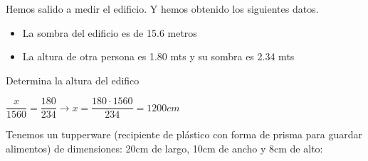 \documentclass[addpoints,spanish, 12pt,a4paper]{exam}
\begin{document}
\begin{questions}
\question[1] Hemos salido a medir el edificio. Y hemos obtenido los siguientes datos.\begin{itemize}
\item La sombra del edificio es de 15.6 metros
\item La altura de otra persona es 1.80 mts y su sombra es 2.34 mts
\end{itemize}
Determina la altura del edifico
\begin{solution} $\dfrac{x}{1560}=\dfrac{180}{234} \to x=\dfrac{180\cdot1560}{234}= 1200 cm$  \end{solution}

\question Tenemos un tupperware (recipiente de plástico con forma de prisma para guardar alimentos) de dimensiones: 20cm de largo, 10cm de ancho y 8cm de alto:


\addpoints

\end{questions}
\end{document}
